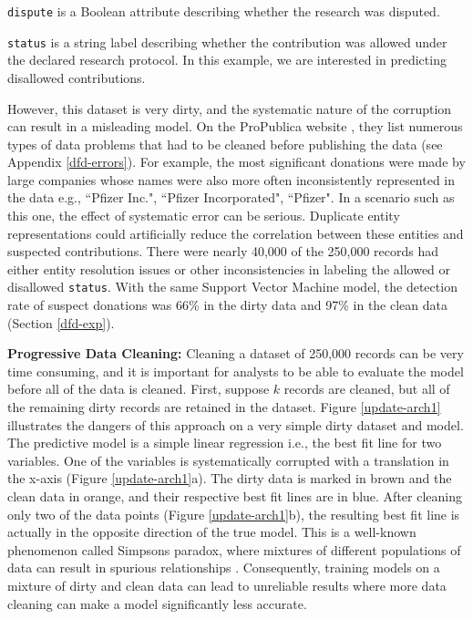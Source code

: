 \noindent\texttt{dispute} is a Boolean attribute describing whether the research was disputed.

\noindent\texttt{status} is a string label describing whether the contribution was allowed under the declared research protocol. In this example, we are interested in predicting disallowed contributions. 

\vspace{0.5em}

However, this dataset is very dirty, and the systematic nature of the corruption can result in a misleading model.
On the ProPublica website \cite{dollarsfordocs}, they list numerous types of data problems that had to be cleaned before publishing the data (see Appendix \ref{dfd-errors}).
For example, the most significant donations were made by large companies whose names were also more often inconsistently represented in the data e.g., ``Pfizer Inc.", ``Pfizer Incorporated", ``Pfizer".
In a scenario such as this one, the effect of systematic error can be serious.
Duplicate entity representations could artificially reduce the correlation between these entities and suspected contributions.
There were nearly 40,000 of the 250,000 records had either entity resolution issues or other inconsistencies in labeling the allowed or disallowed \texttt{status}.
With the same Support Vector Machine model, the detection rate of suspect donations was 66\% in the dirty data and 97\% in the clean data (Section \ref{dfd-exp}).

\vspace{0.25em}

\noindent\textbf{Progressive Data Cleaning: }  Cleaning a dataset of 250,000 records can be very time consuming, and it is important for analysts to be able to evaluate the model before all of the data is cleaned.
First, suppose $k$ records are cleaned, but all of the remaining dirty records are retained in the dataset.
Figure \ref{update-arch1} illustrates the dangers of this approach on a very simple dirty dataset and model.
The predictive model is a simple linear regression i.e., the best fit line for two variables. 
One of the variables is systematically corrupted with a translation in the x-axis (Figure \ref{update-arch1}a).
The dirty data is marked in brown and the clean data in orange, and their respective best fit lines are in blue.
After cleaning only two of the data points (Figure \ref{update-arch1}b), the resulting best fit line is actually in the opposite direction of the true model.
This is a well-known phenomenon called Simpsons paradox, where mixtures of different populations of data can result in spurious relationships \cite{simpson1951interpretation}.
Consequently, training models on a mixture of dirty and clean data can lead to unreliable results where more data cleaning can make a model significantly less accurate.


